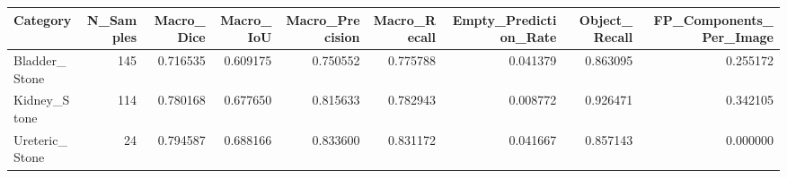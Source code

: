 \begin{tabular}{lrrrrrrrr}
\toprule
Category & N_Samples & Macro_Dice & Macro_IoU & Macro_Precision & Macro_Recall & Empty_Prediction_Rate & Object_Recall & FP_Components_Per_Image \\
\midrule
Bladder_Stone & 145 & 0.716535 & 0.609175 & 0.750552 & 0.775788 & 0.041379 & 0.863095 & 0.255172 \\
Kidney_Stone & 114 & 0.780168 & 0.677650 & 0.815633 & 0.782943 & 0.008772 & 0.926471 & 0.342105 \\
Ureteric_Stone & 24 & 0.794587 & 0.688166 & 0.833600 & 0.831172 & 0.041667 & 0.857143 & 0.000000 \\
\bottomrule
\end{tabular}
